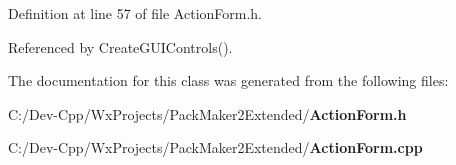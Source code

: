 Definition at line 57 of file Action\-Form.h.

Referenced by Create\-GUIControls().

The documentation for this class was generated from the following files:\begin{CompactItemize}
\item 
C:/Dev-Cpp/Wx\-Projects/Pack\-Maker2Extended/{\bf Action\-Form.h}\item 
C:/Dev-Cpp/Wx\-Projects/Pack\-Maker2Extended/{\bf Action\-Form.cpp}\end{CompactItemize}

